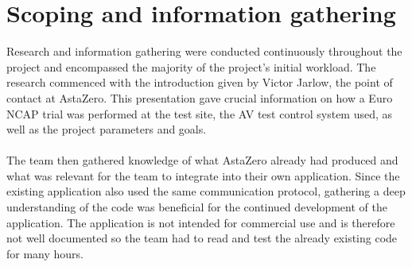 \section{Scoping and information gathering}
Research and information gathering were conducted continuously throughout the project and encompassed the majority of the project's initial workload. The research commenced with the introduction given by Victor Jarlow, the point of contact at AstaZero. This presentation gave crucial information on how a Euro NCAP trial was performed at the test site, the AV test control system used, as well as the project parameters and goals.
\\ \\
The team then gathered knowledge of what AstaZero already had produced and what was relevant for the team to integrate into their own application. Since the existing application also used the same communication protocol, gathering a deep understanding of the code was beneficial for the continued development of the application. The application is not intended for commercial use and is therefore not well documented so the team had to read and test the already existing code for many hours.





